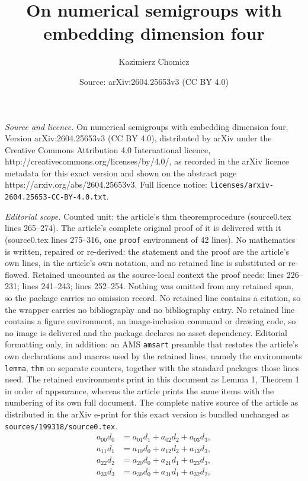 \documentclass[10pt,a4paper]{amsart}
\title{On numerical semigroups with embedding dimension four}
\author{Kazimierz Chomicz}
\date{Source: arXiv:2604.25653v3 (CC BY 4.0)}
\begin{document}
\maketitle

\noindent\emph{Source and licence.} On numerical semigroups with embedding dimension four. Version arXiv:2604.25653v3 (CC BY 4.0), distributed by arXiv under the Creative Commons Attribution 4.0 International licence, http://creativecommons.org/licenses/by/4.0/, as recorded in the arXiv licence metadata for this exact version and shown on the abstract page https://arxiv.org/abs/2604.25653v3. Full licence notice: \texttt{licenses/arxiv-2604.25653-CC-BY-4.0.txt}.\par\smallskip

\noindent\textit{Editorial scope.} Counted unit: the article's thm theoremprocedure (source0.tex lines 265--274). The article's complete original proof of it is delivered with it (source0.tex lines 275--316, one \texttt{proof} environment of 42 lines). No mathematics is written, repaired or re-derived: the statement and the proof are the article's own lines, in the article's own notation, and no retained line is substituted or re-flowed.  Retained uncounted as the source-local context the proof needs: lines 226--231; lines 241--243; lines 252--254.  Nothing was omitted from any retained span, so the package carries no omission record.  No retained line contains a citation, so the wrapper carries no bibliography and no bibliography entry.  No retained line contains a figure environment, an image-inclusion command or drawing code, so no image is delivered and the package declares no asset dependency.  Editorial formatting only, in addition: an AMS \texttt{amsart} preamble that restates the article's own declarations and macros used by the retained lines, namely the environments \texttt{lemma}, \texttt{thm} on separate counters, together with the standard packages those lines need.  The retained environments print in this document as Lemma 1, Theorem 1 in order of appearance, whereas the article prints the same items with the numbering of its own full document.  The complete native source of the article as distributed in the arXiv e-print for this exact version is bundled unchanged as \texttt{sources/199318/source0.tex}.
\begin{align}
    a_{00} d_0 &= a_{01} d_1 + a_{02}d_2 + a_{03} d_3,  \label{minrelation-0} \\
    a_{11} d_1 &= a_{10} d_0+a_{12} d_2 + a_{13} d_3,  \\
    a_{22} d_2 &=a_{20} d_0+ a_{21} d_1 + a_{23} d_3,  \\
    a_{33} d_3 &= a_{30} d_0 +a_{31} d_1 + a_{32} d_2, 
\end{align}
\end{document}
